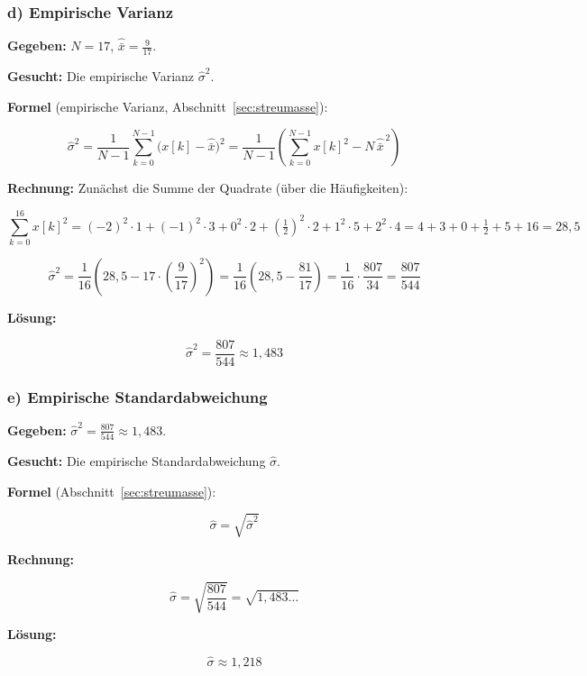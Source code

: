 \subsubsection*{d) Empirische Varianz}

\begin{beispiel}

\textbf{Gegeben:} $N = 17$, $\hat{\bar{x}} = \tfrac{9}{17}$.

\textbf{Gesucht:} Die empirische Varianz $\hat{\sigma}^2$.

\textbf{Formel} (empirische Varianz, Abschnitt~\ref{sec:streumasse}):

$$
\hat{\sigma}^2 = \frac{1}{N-1} \sum_{k=0}^{N-1} \bigl(x[k] - \hat{\bar{x}}\bigr)^2
= \frac{1}{N-1}\left( \sum_{k=0}^{N-1} x[k]^2 - N\,\hat{\bar{x}}^{\,2} \right)
$$

\textbf{Rechnung:} Zunächst die Summe der Quadrate (über die Häufigkeiten):

$$
\sum_{k=0}^{16} x[k]^2
= (-2)^2\cdot 1 + (-1)^2\cdot 3 + 0^2\cdot 2 + \left(\tfrac12\right)^2\cdot 2
  + 1^2\cdot 5 + 2^2\cdot 4
= 4 + 3 + 0 + \tfrac12 + 5 + 16 = 28{,}5
$$

$$
\hat{\sigma}^2 = \frac{1}{16}\left( 28{,}5 - 17\cdot\left(\frac{9}{17}\right)^2 \right)
= \frac{1}{16}\left( 28{,}5 - \frac{81}{17} \right)
= \frac{1}{16}\cdot \frac{807}{34}
= \frac{807}{544}
$$

\textbf{Lösung:}

$$
\boxed{\;\hat{\sigma}^2 = \frac{807}{544} \approx 1{,}483\;}
$$

\end{beispiel}

\subsubsection*{e) Empirische Standardabweichung}

\begin{beispiel}

\textbf{Gegeben:} $\hat{\sigma}^2 = \tfrac{807}{544} \approx 1{,}483$.

\textbf{Gesucht:} Die empirische Standardabweichung $\hat{\sigma}$.

\textbf{Formel} (Abschnitt~\ref{sec:streumasse}):

$$
\hat{\sigma} = \sqrt{\hat{\sigma}^2}
$$

\textbf{Rechnung:}

$$
\hat{\sigma} = \sqrt{\frac{807}{544}} = \sqrt{1{,}483\ldots}
$$

\textbf{Lösung:}

$$
\boxed{\;\hat{\sigma} \approx 1{,}218\;}
$$

\end{beispiel}

